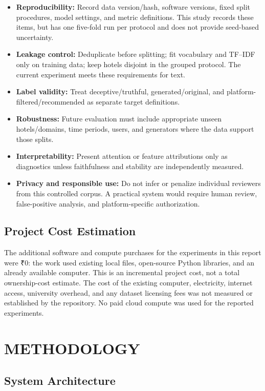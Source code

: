 \documentclass[12pt,a4paper]{report}
\begin{document}
\begin{itemize}
    \item \textbf{Reproducibility:} Record data version/hash, software versions, fixed split procedures, model settings, and metric definitions. This study records these items, but has one five-fold run per protocol and does not provide seed-based uncertainty.
    \item \textbf{Leakage control:} Deduplicate before splitting; fit vocabulary and TF--IDF only on training data; keep hotels disjoint in the grouped protocol. The current experiment meets these requirements for text.
    \item \textbf{Label validity:} Treat deceptive/truthful, generated/original, and platform-filtered/recommended as separate target definitions.
    \item \textbf{Robustness:} Future evaluation must include appropriate unseen hotels/domains, time periods, users, and generators where the data support those splits.
    \item \textbf{Interpretability:} Present attention or feature attributions only as diagnostics unless faithfulness and stability are independently measured.
    \item \textbf{Privacy and responsible use:} Do not infer or penalize individual reviewers from this controlled corpus. A practical system would require human review, false-positive analysis, and platform-specific authorization.
\end{itemize}

\section{Project Cost Estimation}

The additional software and compute purchases for the experiments in this report were ₹0: the work used existing local files, open-source Python libraries, and an already available computer. This is an incremental project cost, not a total ownership-cost estimate. The cost of the existing computer, electricity, internet access, university overhead, and any dataset licensing fees was not measured or established by the repository. No paid cloud compute was used for the reported experiments.

\chapter{METHODOLOGY}

\section{System Architecture}
\end{document}
